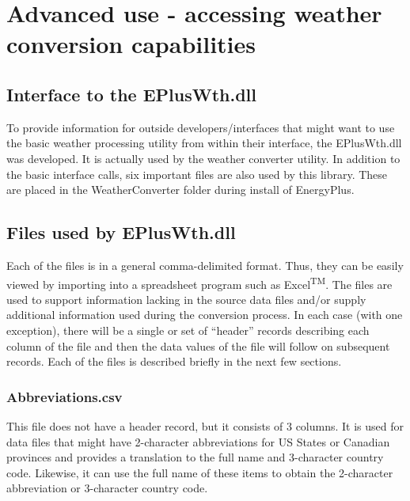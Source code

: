 \section{Advanced use - accessing weather conversion capabilities}\label{advanced-use---accessing-weather-conversion-capabilities}

\subsection{Interface to the EPlusWth.dll}\label{interface-to-the-epluswth.dll}

To provide information for outside developers/interfaces that might want to use the basic weather processing utility from within their interface, the EPlusWth.dll was developed. It is actually used by the weather converter utility. In addition to the basic interface calls, six important files are also used by this library. These are placed in the WeatherConverter folder during install of EnergyPlus.

\subsection{Files used by EPlusWth.dll}\label{files-used-by-epluswth.dll}

Each of the files is in a general comma-delimited format. Thus, they can be easily viewed by importing into a spreadsheet program such as Excel\textsuperscript{TM}. The files are used to support information lacking in the source data files and/or supply additional information used during the conversion process. In each case (with one exception), there will be a single or set of ``header'' records describing each column of the file and then the data values of the file will follow on subsequent records. Each of the files is described briefly in the next few sections.

\subsubsection{Abbreviations.csv}\label{abbreviations.csv}

This file does not have a header record, but it consists of 3 columns. It is used for data files that might have 2-character abbreviations for US States or Canadian provinces and provides a translation to the full name and 3-character country code. Likewise, it can use the full name of these items to obtain the 2-character abbreviation or 3-character country code.

